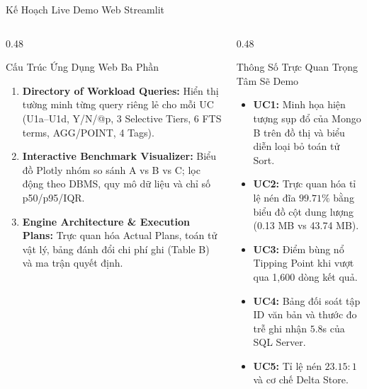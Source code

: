 \documentclass[aspectratio=169,9pt]{beamer}
\begin{document}
\begin{frame}{Kế Hoạch Live Demo Web Streamlit}
\begin{columns}[T]
\begin{column}{0.48\textwidth}
\begin{block}{Cấu Trúc Ứng Dụng Web Ba Phần}
\begin{enumerate}
  \item \textbf{Directory of Workload Queries:} Hiển thị tường minh từng query riêng lẻ cho mỗi UC (U1a--U1d, Y/N/@p, 3 Selective Tiers, 6 FTS terms, AGG/POINT, 4 Tags).
  \item \textbf{Interactive Benchmark Visualizer:} Biểu đồ Plotly nhóm so sánh A vs B vs C; lọc động theo DBMS, quy mô dữ liệu và chỉ số p50/p95/IQR.
  \item \textbf{Engine Architecture \& Execution Plans:} Trực quan hóa Actual Plans, toán tử vật lý, bảng đánh đổi chi phí ghi (Table B) và ma trận quyết định.
\end{enumerate}
\end{block}
\end{column}

\begin{column}{0.48\textwidth}
\begin{exampleblock}{Thông Số Trực Quan Trọng Tâm Sẽ Demo}
\begin{itemize}
  \item \textbf{UC1:} Minh họa hiện tượng sụp đổ của Mongo B trên đồ thị và biểu diễn loại bỏ toán tử Sort.
  \item \textbf{UC2:} Trực quan hóa tỉ lệ nén đĩa $99.71\%$ bằng biểu đồ cột dung lượng (0.13 MB vs 43.74 MB).
  \item \textbf{UC3:} Điểm bùng nổ Tipping Point khi vượt qua 1,600 dòng kết quả.
  \item \textbf{UC4:} Bảng đối soát tập ID văn bản và thước đo trễ ghi nhận $5.8$s của SQL Server.
  \item \textbf{UC5:} Tỉ lệ nén $23.15:1$ và cơ chế Delta Store.
\end{itemize}
\end{exampleblock}
\end{column}
\end{columns}
\end{frame}
\end{document}

